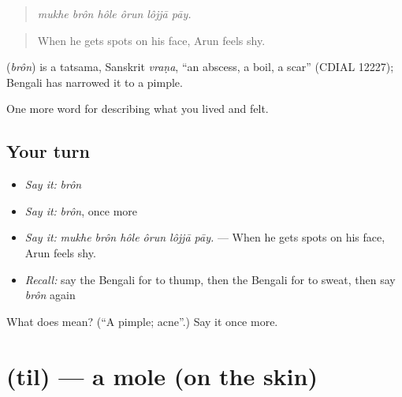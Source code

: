 \begin{quote}
     
\end{quote}

\begin{quote}
\emph{mukhe brôn hôle ôrun lôjjā pāy.}
\end{quote}

\begin{quote}
When he gets spots on his face, Arun feels shy.
\end{quote}

\begin{cousinweb}
\textbf{} (\emph{brôn}) is a tatsama, Sanskrit \emph{vraṇa}, \textquotedblleft{}an abscess, a boil, a scar\textquotedblright{} (CDIAL 12227); Bengali has narrowed it to a pimple.
\end{cousinweb}

\begin{grammarlens}[title={What you've built}]
One more word for describing what you lived and felt.
\end{grammarlens}

\subsection*{Your turn}
\begin{itemize}
\raggedright
  \item \emph{Say it:} \emph{brôn}
  \item \emph{Say it:} \emph{brôn}, once more
  \item \emph{Say it:} \emph{mukhe brôn hôle ôrun lôjjā pāy.} — When he gets spots on his face, Arun feels shy.
  \item \emph{Recall:} say the Bengali for to thump, then the Bengali for to sweat, then say \emph{brôn} again
\end{itemize}

\begin{tcolorbox}[breakable,colback=teal!4,colframe=teal!35!black,title={Before you move on}]
What does  mean? (\textquotedblleft{}A pimple; acne\textquotedblright{}.) Say it once more.
\end{tcolorbox}
\section[\texorpdfstring{\bn{তিল} (til)}{তিল (til)}]{ (til) — a mole (on the skin)}

\label{lesson:BN-C469-til}



